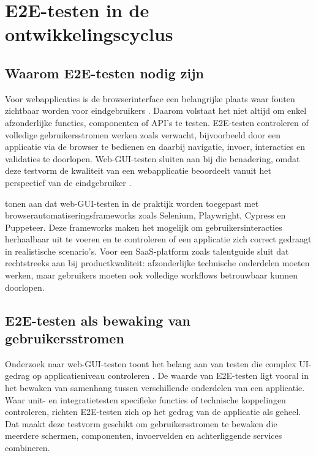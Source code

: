 \section{E2E-testen in de ontwikkelingscyclus}

\subsection{Waarom E2E-testen nodig zijn}

Voor webapplicaties is de browserinterface een belangrijke plaats waar fouten zichtbaar worden voor eindgebruikers \autocite{DiMeglio2026}. Daarom volstaat het niet altijd om enkel afzonderlijke functies, componenten of API's te testen. E2E-testen controleren of volledige gebruikersstromen werken zoals verwacht, bijvoorbeeld door een applicatie via de browser te bedienen en daarbij navigatie, invoer, interacties en validaties te doorlopen. Web-GUI-testen sluiten aan bij die benadering, omdat deze testvorm de kwaliteit van een webapplicatie beoordeelt vanuit het perspectief van de eindgebruiker \autocite{DiMeglio2026}.

\textcite{DiMeglio2026} tonen aan dat web-GUI-testen in de praktijk worden toegepast met browserautomatiseringsframeworks zoals Selenium, Playwright, Cypress en Puppeteer. Deze frameworks maken het mogelijk om gebruikersinteracties herhaalbaar uit te voeren en te controleren of een applicatie zich correct gedraagt in realistische scenario's. Voor een SaaS-platform zoals talentguide sluit dat rechtstreeks aan bij productkwaliteit: afzonderlijke technische onderdelen moeten werken, maar gebruikers moeten ook volledige workflows betrouwbaar kunnen doorlopen.

\subsection{E2E-testen als bewaking van gebruikersstromen}

Onderzoek naar web-GUI-testen toont het belang aan van testen die complex UI-gedrag op applicatieniveau controleren \autocite{DiMeglio2026}. De waarde van E2E-testen ligt vooral in het bewaken van samenhang tussen verschillende onderdelen van een applicatie. Waar unit- en integratietesten specifieke functies of technische koppelingen controleren, richten E2E-testen zich op het gedrag van de applicatie als geheel. Dat maakt deze testvorm geschikt om gebruikersstromen te bewaken die meerdere schermen, componenten, invoervelden en achterliggende services combineren.

